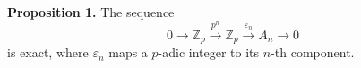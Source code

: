 \textbf{Proposition 1.} The sequence
$$0 \to \mathbb{Z}_p \xrightarrow{p^n} \mathbb{Z}_p \xrightarrow{\varepsilon_n} A_n \to 0$$
is exact, where $\varepsilon_n$ maps a $p$-adic integer to its $n$-th component.
